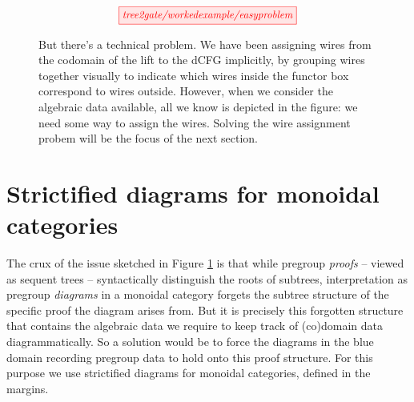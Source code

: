 \begin{figure}[h!]\label{fig:wireproblem}
\[\resizebox{0.5\textwidth}{!}{\tikzfig{tree2gate/workedexample/easyproblem}}\]
\caption{
But there's a technical problem. We have been assigning wires from the codomain of the lift to the dCFG implicitly, by grouping wires together visually to indicate which wires inside the functor box correspond to wires outside. However, when we consider the algebraic data available, all we know is depicted in the figure: we need some way to assign the wires. Solving the wire assignment probem will be the focus of the next section.
}
\end{figure}
\clearpage
\section{Strictified diagrams for monoidal categories}

The crux of the issue sketched in Figure \ref{fig:wireproblem} is that while pregroup \emph{proofs} -- viewed as sequent trees -- syntactically distinguish the roots of subtrees, interpretation as pregroup \emph{diagrams} in a monoidal category forgets the subtree structure of the specific proof the diagram arises from. But it is precisely this forgotten structure that contains the algebraic data we require to keep track of (co)domain data diagrammatically. So a solution would be to force the diagrams in the blue domain recording pregroup data to hold onto this proof structure. For this purpose we use strictified diagrams for monoidal categories, defined in the margins.\\



